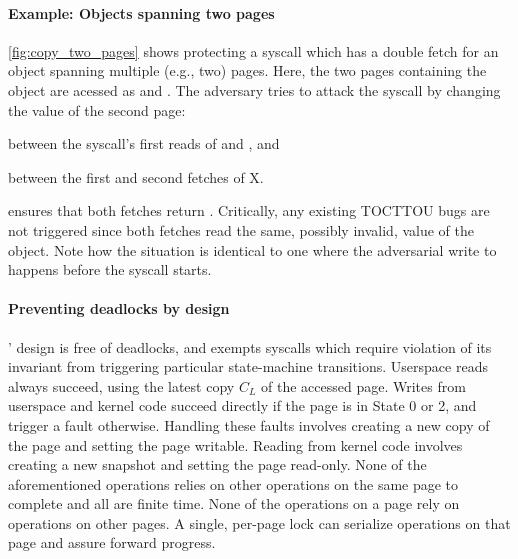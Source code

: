 \documentclass[letterpaper,twocolumn,10pt]{article}
\begin{document}
\paragraph{Example: Objects spanning two pages}
\autoref{fig:copy_two_pages} shows \midas protecting a syscall which
has a double fetch for an object spanning multiple (e.g., two) pages.
Here, the two pages containing the object  are acessed as 
 and . 
The adversary tries to attack the syscall by changing the value of the 
second page:
\begin{inparaenum}
\item between the syscall's first reads of  and , and
\item between the first and second fetches of X.
\end{inparaenum}
\midas ensures that both fetches return .
Critically, any existing TOCTTOU bugs are not triggered since both fetches 
read the same, possibly invalid, value of the object.
Note how the situation is identical to one where the adversarial write 
to  happens before the syscall starts.

\paragraph{Preventing deadlocks by design}
\midas' design is free of deadlocks, and exempts syscalls which 
require violation of its invariant from triggering particular 
state-machine transitions.
Userspace reads always succeed, using the latest copy $C_L$ of the
accessed page.
Writes from userspace and kernel code succeed directly if the 
page is in State 0 or 2, and trigger a fault otherwise.
Handling these faults involves creating a new copy of the page and
setting the page writable. 
Reading from kernel code involves creating a new snapshot and 
setting the page read-only.
None of the aforementioned operations relies on other operations 
on the same page to complete and all are finite time.
None of the operations on a page rely on operations on other pages.
A single, per-page lock can serialize operations on that page
and assure forward progress.
\end{document}
